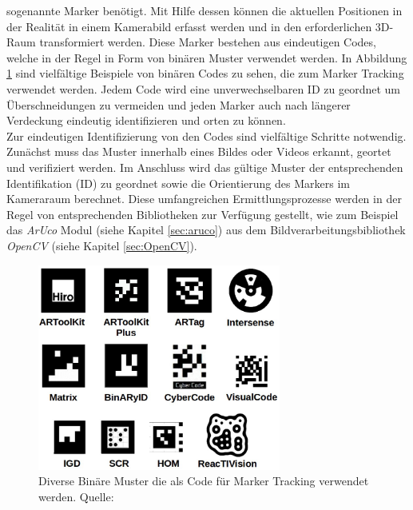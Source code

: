 sogenannte Marker benötigt. Mit Hilfe dessen können die aktuellen Positionen in der Realität in einem Kamerabild erfasst werden und in den erforderlichen 3D-Raum transformiert werden. Diese Marker bestehen aus eindeutigen Codes, welche in der Regel in Form von binären Muster verwendet werden. In Abbildung \ref{fig:BinMarker} sind vielfältige Beispiele von binären Codes zu sehen, die zum Marker Tracking verwendet werden. Jedem Code wird eine unverwechselbaren ID zu geordnet um Überschneidungen zu vermeiden und jeden Marker auch nach längerer Verdeckung eindeutig identifizieren und orten zu können.\\
Zur eindeutigen Identifizierung von den Codes sind vielfältige Schritte notwendig. Zunächst muss das Muster innerhalb eines Bildes oder Videos erkannt, geortet und verifiziert werden. Im Anschluss wird das gültige Muster der entsprechenden Identifikation (ID) zu geordnet sowie die Orientierung des Markers im Kameraraum berechnet. Diese umfangreichen Ermittlungsprozesse werden in der Regel von entsprechenden Bibliotheken zur Verfügung gestellt, wie zum Beispiel das \textit{ArUco} Modul (siehe Kapitel \ref{sec:aruco}) aus dem Bildverarbeitungsbibliothek \textit{OpenCV} (siehe Kapitel \ref{sec:OpenCV}). \\
\begin{figure}[H] 
	\center 
	\includegraphics[width=8cm]{Bilder/BinMuster.jpg}			
	\caption{Diverse Binäre Muster die als Code für Marker Tracking verwendet werden. Quelle: \cite{article:Aruco2014}}
	\label{fig:BinMarker}
\end{figure}
